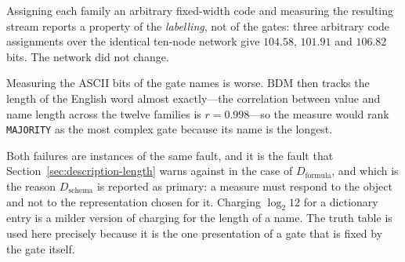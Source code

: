 \documentclass[11pt]{article}
\begin{document}
Assigning each family an arbitrary fixed-width code and measuring the resulting
stream reports a property of the \emph{labelling}, not of the gates: three
arbitrary code assignments over the identical ten-node network give
$104.58$, $101.91$ and $106.82$ bits.  The network did not change.

Measuring the ASCII bits of the gate names is worse.  BDM then tracks the length
of the English word almost exactly---the correlation between value and name
length across the twelve families is $r=0.998$---so the measure would rank
\texttt{MAJORITY} as the most complex gate because its name is the longest.

Both failures are instances of the same fault, and it is the fault that
Section~\ref{sec:description-length} warns against in the case of
$D_{\mathrm{formula}}$, and which is the reason $D_{\mathrm{schema}}$ is
reported as primary: a measure must respond to the object and not to the
representation chosen for it.  Charging $\log_2 12$ for a dictionary entry is a
milder version of charging for the length of a name.  The truth table is used here precisely because
it is the one presentation of a gate that is fixed by the gate itself.



\end{document}
